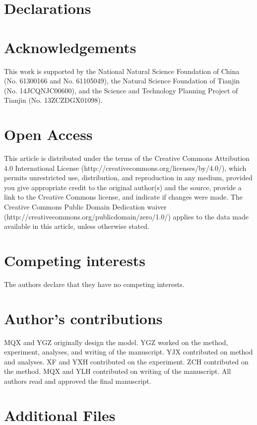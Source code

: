 \documentclass{bmcart}
\begin{document}
\section*{Declarations}
\begin{backmatter}

\section*{Acknowledgements}
This work is supported by the National Natural Science Foundation of China (No. 61300166 and No. 61105049), the Natural Science Foundation of Tianjin (No. 14JCQNJC00600), and the Science and Technology Planning Project of Tianjin (No. 13ZCZDGX01098).
\section*{Open Access}
This article is distributed under the terms of the Creative Commons Attribution 4.0 International License (http://creativecommons.org/licenses/by/4.0/), which permits unrestricted use, distribution, and reproduction in any medium, provided you give appropriate credit to the original author(s) and the source, provide a link to the Creative Commons license, and indicate if changes were made. The Creative Commons Public Domain Dedication waiver (http://creativecommons.org/publicdomain/zero/1.0/) applies to the data made available in this article, unless otherwise stated.

\section*{Competing interests}
The authors declare that they have no competing interests.

\section*{Author's contributions}
MQX and YGZ originally design the model. YGZ worked on the method, experiment, analyses, and writing of the manuscript. YJX  contributed on method and analyses.  XF and YXH contributed on the experiment. ZCH contributed on the method. MQX and YLH contributed on writing of the manuscript. All authors read and approved the final manuscript.
\section*{Additional Files}

\end{backmatter}
\end{document}
